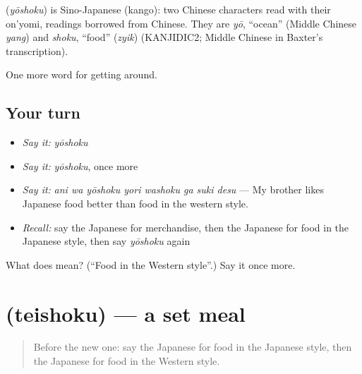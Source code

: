 \begin{cousinweb}
\textbf{} (\emph{yōshoku}) is Sino-Japanese (kango): two Chinese characters read with their on'yomi, readings borrowed from Chinese. They are \emph{yō}, \textquotedblleft{}ocean\textquotedblright{} (Middle Chinese \emph{yang}) and \emph{shoku}, \textquotedblleft{}food\textquotedblright{} (\emph{zyik}) (KANJIDIC2; Middle Chinese in Baxter's transcription).
\end{cousinweb}

\begin{grammarlens}[title={What you've built}]
One more word for getting around.
\end{grammarlens}

\subsection*{Your turn}
\begin{itemize}
\raggedright
  \item \emph{Say it:} \emph{yōshoku}
  \item \emph{Say it:} \emph{yōshoku}, once more
  \item \emph{Say it:} \emph{ani wa yōshoku yori washoku ga suki desu} — My brother likes Japanese food better than food in the western style.
  \item \emph{Recall:} say the Japanese for merchandise, then the Japanese for food in the Japanese style, then say \emph{yōshoku} again
\end{itemize}

\begin{tcolorbox}[breakable,colback=teal!4,colframe=teal!35!black,title={Before you move on}]
What does  mean? (\textquotedblleft{}Food in the Western style\textquotedblright{}.) Say it once more.
\end{tcolorbox}
\section[\texorpdfstring{\ja{ていしょく} (teishoku)}{ていしょく (teishoku)}]{ (teishoku) — a set meal}

\label{lesson:JA-C422-teishoku}



\begin{quote}
Before the new one: say the Japanese for food in the Japanese style, then the Japanese for food in the Western style.
\end{quote}

